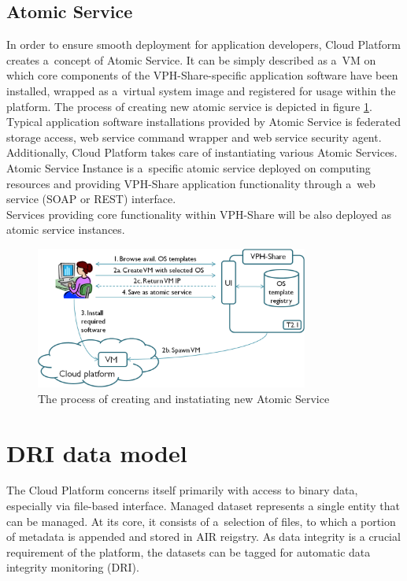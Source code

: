 \subsection{Atomic Service}
\label{atomic-service}
In order to ensure smooth deployment for application developers, Cloud Platform
creates a~concept of Atomic Service. It can be simply described as a~VM on which
core components of the VPH-Share-specific application software have been installed,
wrapped as a~virtual system image and registered for usage within the platform. The
process of creating new atomic service is depicted in figure \ref{fig:atomic-service}.
Typical application software installations provided by Atomic Service is federated
storage access, web service command wrapper and web service security agent. Additionally,
Cloud Platform takes care of instantiating various Atomic Services. Atomic Service
Instance is a~specific atomic service deployed on computing resources and providing
VPH-Share application functionality through a~web service (SOAP or REST) interface.\\

Services providing core functionality within VPH-Share will be also deployed as atomic
service instances. 

\begin{figure}[h!]
	\centering
	\includegraphics[width=0.8\textwidth]{images/vph-atomic-service.png}
	\caption{The process of creating and instatiating new Atomic Service}
	\label{fig:atomic-service}
\end{figure}


\section{DRI data model}
The Cloud Platform concerns itself primarily with access to binary data, 
especially via file-based interface. Managed dataset represents a single entity
that can be managed. At its core, it consists of a~selection of
files, to which a portion of metadata is appended and stored in AIR reigstry. 
As data integrity is a crucial requirement of the platform, the datasets can be
tagged for automatic data integrity monitoring (DRI). 

